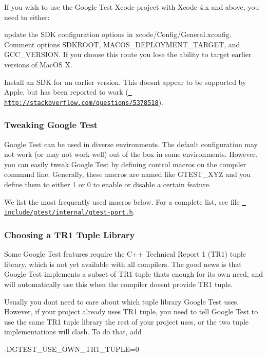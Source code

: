 If you wish to use the Google Test Xcode project with Xcode 4.\+x and above, you need to either\+:


\begin{DoxyItemize}
\item update the S\+DK configuration options in xcode/\+Config/\+General.\+xconfig. Comment options {\ttfamily S\+D\+K\+R\+O\+OT}, {\ttfamily M\+A\+C\+O\+S\+\_\+\+D\+E\+P\+L\+O\+Y\+M\+E\+N\+T\+\_\+\+T\+A\+R\+G\+ET}, and {\ttfamily G\+C\+C\+\_\+\+V\+E\+R\+S\+I\+ON}. If you choose this route you lose the ability to target earlier versions of Mac\+OS X.
\item Install an S\+DK for an earlier version. This doesn\textquotesingle{}t appear to be supported by Apple, but has been reported to work (\href{http://stackoverflow.com/questions/5378518}{\texttt{ http\+://stackoverflow.\+com/questions/5378518}}).
\end{DoxyItemize}

\subsubsection*{Tweaking Google Test}

Google Test can be used in diverse environments. The default configuration may not work (or may not work well) out of the box in some environments. However, you can easily tweak Google Test by defining control macros on the compiler command line. Generally, these macros are named like {\ttfamily G\+T\+E\+S\+T\+\_\+\+X\+YZ} and you define them to either 1 or 0 to enable or disable a certain feature.

We list the most frequently used macros below. For a complete list, see file \href{https://github.com/google/googletest/blob/master/include/gtest/internal/gtest-port.h}{\texttt{ include/gtest/internal/gtest-\/port.\+h}}.

\subsubsection*{Choosing a T\+R1 Tuple Library}

Some Google Test features require the C++ Technical Report 1 (T\+R1) tuple library, which is not yet available with all compilers. The good news is that Google Test implements a subset of T\+R1 tuple that\textquotesingle{}s enough for its own need, and will automatically use this when the compiler doesn\textquotesingle{}t provide T\+R1 tuple.

Usually you don\textquotesingle{}t need to care about which tuple library Google Test uses. However, if your project already uses T\+R1 tuple, you need to tell Google Test to use the same T\+R1 tuple library the rest of your project uses, or the two tuple implementations will clash. To do that, add \begin{DoxyVerb}-DGTEST_USE_OWN_TR1_TUPLE=0
\end{DoxyVerb}


